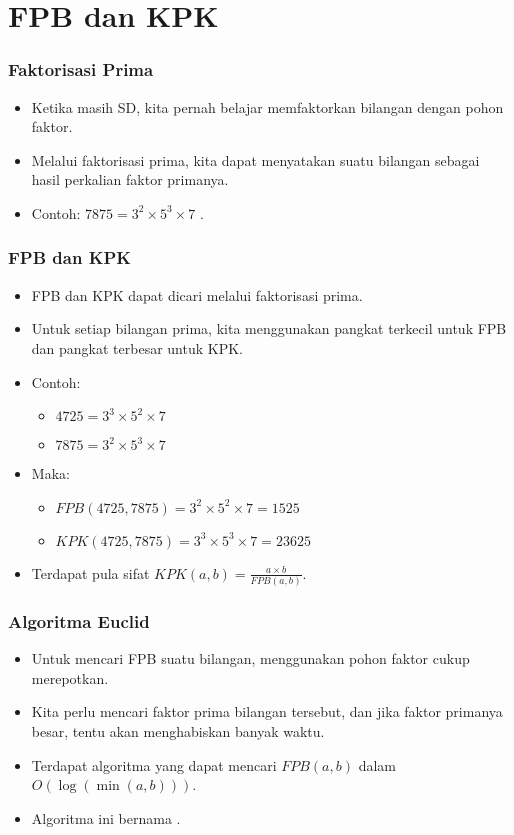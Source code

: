 \section{FPB dan KPK}
\frame{\sectionpage}

\begin{frame}
\frametitle{Faktorisasi Prima}
\begin{itemize}
  \item Ketika masih SD, kita pernah belajar memfaktorkan bilangan dengan pohon faktor.
  \item Melalui faktorisasi prima, kita dapat menyatakan suatu bilangan sebagai hasil perkalian faktor primanya.
  \item Contoh: $7875 = 3^{2} \times 5^{3} \times 7$ .
\end{itemize}
\end{frame}

\begin{frame}
\frametitle{FPB dan KPK}
\begin{itemize}
  \item FPB dan KPK dapat dicari melalui faktorisasi prima. 
  \item Untuk setiap bilangan prima, kita menggunakan pangkat terkecil untuk FPB dan pangkat terbesar untuk KPK.
  \item Contoh:
  \begin{itemize}
    \item $4725 = 3^{3} \times 5^{2} \times 7$
    \item $7875 = 3^{2} \times 5^{3} \times 7$
  \end{itemize}
  \item Maka: 
  \begin{itemize}
    \item $FPB(4725,7875) = 3^{2} \times 5^{2} \times 7 = 1525$
    \item $KPK(4725,7875) = 3^{3} \times 5^{3} \times 7 = 23625$
    \newline
  \end{itemize}
  \item Terdapat pula sifat $KPK(a,b) = \frac{a \times b}{FPB(a,b)}$. 
\end{itemize}
\end{frame}

\begin{frame}
\frametitle{Algoritma Euclid}
\begin{itemize}
  \item Untuk mencari FPB suatu bilangan, menggunakan pohon faktor cukup merepotkan.
  \item Kita perlu mencari faktor prima bilangan tersebut, dan jika faktor primanya besar, tentu akan menghabiskan banyak waktu.
  \item Terdapat algoritma yang dapat mencari $FPB(a,b)$ dalam $O(\log{(\min{(a,b)})})$.
  \item Algoritma ini bernama .
\end{itemize}
\end{frame}

